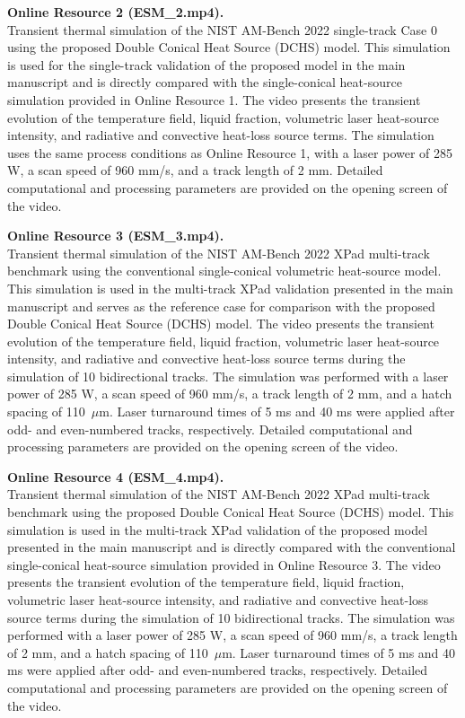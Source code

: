 \documentclass[11pt]{article}
\begin{document}
\medskip

\textbf{Online Resource 2 (ESM\_2.mp4).}\\
Transient thermal simulation of the NIST AM-Bench 2022 single-track
Case 0 using the proposed Double Conical Heat Source (DCHS) model.
This simulation is used for the single-track validation of the proposed
model in the main manuscript and is directly compared with the
single-conical heat-source simulation provided in Online Resource 1.
The video presents the transient evolution of the temperature field,
liquid fraction, volumetric laser heat-source intensity, and radiative
and convective heat-loss source terms. The simulation uses the same
process conditions as Online Resource 1, with a laser power of 285 W,
a scan speed of 960 mm/s, and a track length of 2 mm. Detailed
computational and processing parameters are provided on the opening
screen of the video.

\medskip

\textbf{Online Resource 3 (ESM\_3.mp4).}\\
Transient thermal simulation of the NIST AM-Bench 2022 XPad
multi-track benchmark using the conventional single-conical
volumetric heat-source model. This simulation is used in the
multi-track XPad validation presented in the main manuscript and
serves as the reference case for comparison with the proposed Double
Conical Heat Source (DCHS) model. The video presents the transient
evolution of the temperature field, liquid fraction, volumetric laser
heat-source intensity, and radiative and convective heat-loss source
terms during the simulation of 10 bidirectional tracks. The simulation
was performed with a laser power of 285 W, a scan speed of 960 mm/s,
a track length of 2 mm, and a hatch spacing of 110~$\mu$m. Laser
turnaround times of 5 ms and 40 ms were applied after odd- and
even-numbered tracks, respectively. Detailed computational and
processing parameters are provided on the opening screen of the video.

\medskip

\textbf{Online Resource 4 (ESM\_4.mp4).}\\
Transient thermal simulation of the NIST AM-Bench 2022 XPad
multi-track benchmark using the proposed Double Conical Heat Source
(DCHS) model. This simulation is used in the multi-track XPad
validation of the proposed model presented in the main manuscript
and is directly compared with the conventional single-conical
heat-source simulation provided in Online Resource 3. The video
presents the transient evolution of the temperature field, liquid
fraction, volumetric laser heat-source intensity, and radiative and
convective heat-loss source terms during the simulation of 10
bidirectional tracks. The simulation was performed with a laser
power of 285 W, a scan speed of 960 mm/s, a track length of 2 mm,
and a hatch spacing of 110~$\mu$m. Laser turnaround times of 5 ms
and 40 ms were applied after odd- and even-numbered tracks,
respectively. Detailed computational and processing parameters are
provided on the opening screen of the video.
\end{document}
